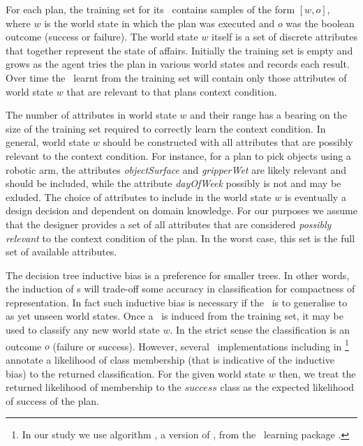 For each plan, the training set for its \dt\ contains samples of the form $[w,o]$, where $w$ is the world state in which the plan was executed and $o$ was the boolean outcome (success or failure). The world state $w$ itself is a set of discrete attributes that together represent the state of affairs. Initially the training set is empty and grows as the agent tries the plan in various world states and records each result. Over time the \dt\ learnt from the training set will contain only those attributes of world state $w$ that are relevant to that plans context condition.

The number of attributes in world state $w$ and their range has a bearing on the size of the training set required to correctly learn the context condition. In general, world state $w$ should be constructed with all attributes that are possibly relevant to the context condition. For instance, for a plan to pick objects using a robotic arm, the attributes \textit{objectSurface} and \textit{gripperWet} are likely relevant and should be included, while the attribute \textit{dayOfWeek} possibly is not and may be exluded. The choice of attributes to include in the world state $w$ is eventually a design decision and dependent on domain knowledge. For our purposes we assume that the designer provides a set of all attributes that are considered \textit{possibly relevant} to the context condition of the plan. In the worst case, this set is the full set of available attributes. 

The decision tree inductive bias is a preference for smaller trees. In other words, the induction of \dt s will trade-off some accuracy in classification for compactness of representation. In fact such inductive bias is necessary if the \dt\ is to generalise to as yet unseen world states. Once a \dt\ is induced from the training set, it may be used to classify any new world state $w$. In the strict sense the classification is an outcome $o$ (failure or success). However, several \dt\ implementations including  in \weka\footnote{In our study we use algorithm , a version of  \cite{Mitchell97:ML}, from the \weka\ learning package \cite{weka99}.} annotate a likelihood of class membership (that is indicative of the inductive bias) to the returned classification. For the given world state $w$ then, we treat the returned likelihood of membership to the $success$ class as the expected likelihood of success of the plan.


